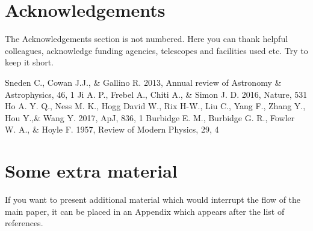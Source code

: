 \documentclass[a4paper,fleqn,usenatbib]{mnras}
\begin{document}
\section*{Acknowledgements}

The Acknowledgements section is not numbered. Here you can thank helpful
colleagues, acknowledge funding agencies, telescopes and facilities used etc.
Try to keep it short.




\begin{thebibliography}{99}
	Sneden C., Cowan J.J., \& Gallino R. 2013, Annual review of Astronomy \& Astrophysics, 46, 1
	Ji A. P., Frebel A., Chiti A., \& Simon J. D. 2016, Nature, 531
	Ho A. Y. Q., Ness M. K., Hogg David W., Rix H-W., Liu C., Yang F., Zhang Y., Hou Y.,\& Wang Y. 2017, ApJ, 836, 1
	Burbidge E. M., Burbidge G. R., Fowler W. A., \& Hoyle F. 1957, Review of Modern Physics, 29, 4
\end{thebibliography}



\appendix
\newpage
\section{Some extra material}

If you want to present additional material which would interrupt the flow of the main paper,
it can be placed in an Appendix which appears after the list of references.
\end{document}
